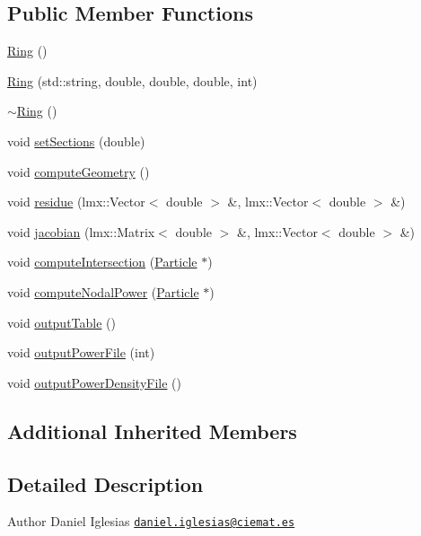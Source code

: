 \subsection*{Public Member Functions}
\begin{DoxyCompactItemize}
\item 
\hyperlink{classRing_afc47f40ab072db783126111b70693e49}{Ring} ()
\item 
\hyperlink{classRing_a0ed22778579e271562469b62c1ed5230}{Ring} (std\-::string, double, double, double, int)
\item 
\hyperlink{classRing_a515a41c0803bcdd921712d6f5047e101}{$\sim$\-Ring} ()
\item 
void \hyperlink{classRing_a4e11fdcade67b41f38a7ec4458afdd8d}{set\-Sections} (double)
\item 
void \hyperlink{classRing_a773ec5b24a5dc39a1f5755b43c20edb6}{compute\-Geometry} ()
\item 
void \hyperlink{classRing_a3dbac86733d87654134a284a800a1a28}{residue} (lmx\-::\-Vector$<$ double $>$ \&, lmx\-::\-Vector$<$ double $>$ \&)
\item 
void \hyperlink{classRing_ae5f0673944df86cdd9972fe302483883}{jacobian} (lmx\-::\-Matrix$<$ double $>$ \&, lmx\-::\-Vector$<$ double $>$ \&)
\item 
void \hyperlink{classRing_a8f33372a5df9a8aa8e0718312497fd78}{compute\-Intersection} (\hyperlink{classParticle}{Particle} $\ast$)
\item 
void \hyperlink{classRing_a844fa2f14bcf7d506f33865081543e61}{compute\-Nodal\-Power} (\hyperlink{classParticle}{Particle} $\ast$)
\item 
void \hyperlink{classRing_a6f6508a51866f6189aae6a09772b7cd5}{output\-Table} ()
\item 
void \hyperlink{classRing_a3634ff6b0684ff0a0eb172751eef83a9}{output\-Power\-File} (int)
\item 
void \hyperlink{classRing_ae8851509bb69f45e300bc4772b31ca9c}{output\-Power\-Density\-File} ()
\end{DoxyCompactItemize}
\subsection*{Additional Inherited Members}


\subsection{Detailed Description}
\begin{DoxyAuthor}{Author}
Daniel Iglesias \href{mailto:daniel.iglesias@ciemat.es}{\tt daniel.\-iglesias@ciemat.\-es} 
\end{DoxyAuthor}


